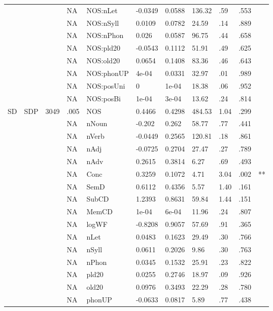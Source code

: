 \begin{table}[ht]
\begin{tabular}{lllllllllll}
   &  &  & NA & NOS:nLet & -0.0349 & 0.0588 & 136.32 & .59 & .553 &   \\ 
   &  &  & NA & NOS:nSyll & 0.0109 & 0.0782 & 24.59 & .14 & .889 &   \\ 
   &  &  & NA & NOS:nPhon & 0.026 & 0.0587 & 96.75 & .44 & .658 &   \\ 
   &  &  & NA & NOS:pld20 & -0.0543 & 0.1112 & 51.91 & .49 & .625 &   \\ 
   &  &  & NA & NOS:old20 & 0.0654 & 0.1408 & 83.36 & .46 & .643 &   \\ 
   &  &  & NA & NOS:phonUP & 4e-04 & 0.0331 & 32.97 & .01 & .989 &   \\ 
   &  &  & NA & NOS:posUni & 0 & 1e-04 & 18.38 & .06 & .952 &   \\ 
   &  &  & NA & NOS:posBi & 1e-04 & 3e-04 & 13.62 & .24 & .814 &   \\ 
  SD & SDP & 3049 & .005 & NOS & 0.4466 & 0.4298 & 484.53 & 1.04 & .299 &   \\ 
   &  &  & NA & nNoun & -0.202 & 0.262 & 58.77 & .77 & .441 &   \\ 
   &  &  & NA & nVerb & -0.0449 & 0.2565 & 120.81 & .18 & .861 &   \\ 
   &  &  & NA & nAdj & -0.0725 & 0.2704 & 27.47 & .27 & .789 &   \\ 
   &  &  & NA & nAdv & 0.2615 & 0.3814 & 6.27 & .69 & .493 &   \\ 
   &  &  & NA & Conc & 0.3259 & 0.1072 & 4.71 & 3.04 & .002 & ** \\ 
   &  &  & NA & SemD & 0.6112 & 0.4356 & 5.57 & 1.40 & .161 &   \\ 
   &  &  & NA & SubCD & 1.2393 & 0.8631 & 59.84 & 1.44 & .151 &   \\ 
   &  &  & NA & MemCD & 1e-04 & 6e-04 & 11.96 & .24 & .807 &   \\ 
   &  &  & NA & logWF & -0.8208 & 0.9057 & 57.69 & .91 & .365 &   \\ 
   &  &  & NA & nLet & 0.0483 & 0.1623 & 29.49 & .30 & .766 &   \\ 
   &  &  & NA & nSyll & 0.0611 & 0.2026 & 9.86 & .30 & .763 &   \\ 
   &  &  & NA & nPhon & 0.0345 & 0.1532 & 25.91 & .23 & .822 &   \\ 
   &  &  & NA & pld20 & 0.0255 & 0.2746 & 18.97 & .09 & .926 &   \\ 
   &  &  & NA & old20 & 0.0976 & 0.3493 & 22.29 & .28 & .780 &   \\ 
   &  &  & NA & phonUP & -0.0633 & 0.0817 & 5.89 & .77 & .438 &   \\ 

\end{tabular}
\end{table}
